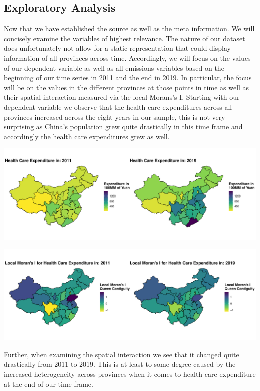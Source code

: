 \documentclass[
]{article}
\begin{document}
	\subsection{Exploratory Analysis}
	Now that we have established the source as well as the meta information. We will concisely examine the variables of highest relevance. The nature of our dataset does unfortunately not allow for a static representation that could display information of all provinces across time. Accordingly, we will focus on the values of our dependent variable as well as all emissions variables based on the beginning of our time series in 2011 and the end in 2019. In particular, the focus will be on the values in the different provinces at those points in time as well as their spatial interaction measured via the local Morans's I. Starting with our dependent variable we observe that the health care expenditures across all provinces increased across the eight years in our sample, this is not very surprising as China's population grew quite drastically in this time frame and accordingly the health care expenditures grew as well.
	\begin{center}
		\includegraphics[width = 440pt]{Health_Care_Expenditures_comp.pdf} 
	\end{center}
	\begin{center}
		\includegraphics[width = 440pt]{Ii_Health_Care_Expenditures_comp.pdf} 
	\end{center}
	Further, when examining the spatial interaction we see that it changed quite drastically from 2011 to 2019. This is at least to some degree caused by the increased heterogeneity across provinces when it comes to health care expenditure at the end of our time frame.\\
\end{document}
